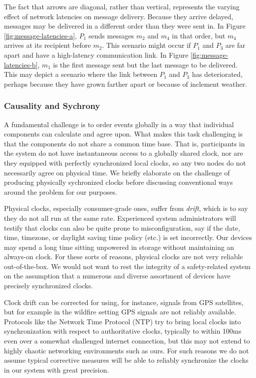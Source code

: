 \documentclass[]             %
{NASA}                       %
\theoremstyle{definition}
\begin{document}
The fact that arrows are diagonal, rather than vertical, represents
the varying effect of network latencies on message delivery. Because
they arrive delayed, messages may be delivered in a different order
than they were sent in. In Figure \ref{fig:message-latencies-a}, $P_1$
sends messages $m_2$ and $m_4$ in that order, but $m_4$ arrives at its
recipient before $m_2$. This scenario might occur if $P_1$ and $P_3$
are far apart and have a high-latency communication link. In Figure
\ref{fig:message-latencies-b}, $m_1$ is the first message sent but the
last message to be delivered. This may depict a scenario where the
link between $P_1$ and $P_3$ has deteriorated, perhaps because they
have grown farther apart or because of inclement weather.

\subsubsection{Causality and  Sychrony}
\label{ssec:causality}
A fundamental challenge is to order events globally in a way that
individual components can calculate and agree upon. What makes this
task challenging is that the components do not share a common time
base. That is, participants in the system do not have instantaneous
access to a globally shared clock, nor are they equipped with
perfectly synchronized local clocks, so any two nodes do not
necessarily agree on physical time. We briefly elaborate on the
challenge of producing physically sychronized clocks before discussing
conventional ways around the problem for our purposes.

Physical clocks, especially consumer-grade ones, suffer from
\emph{drift}, which is to say they do not all run at the same
rate. Experienced system administrators will testify that clocks can
also be quite prone to misconfiguration, say if the date, time,
timezone, or daylight saving time policy (etc.) is set
incorrectly. Our devices may spend a long time sitting unpowered in
storage without maintaining an always-on clock. For these sorts of
reasons, physical clocks are not very reliable out-of-the-box. We
would not want to rest the integrity of a safety-related system on the
assumption that a numerous and diverse assortment of devices have
precisely synchronized clocks.

Clock drift can be corrected for using, for instance, signals from GPS
satellites, but for example in the wildfire setting GPS signals are
not reliably available. Protocols like the Network Time Protocol (NTP)
\cite{rfc1119} try to bring local clocks into synchronization with
respect to authoritative clocks, typically to within 100ms even over a
somewhat challenged internet connection, but this may not extend to
highly chaotic networking environments such as ours. For such reasons
we do not assume typical corrective measures will be able to reliably
synchronize the clocks in our system with great precision.
\end{document}
